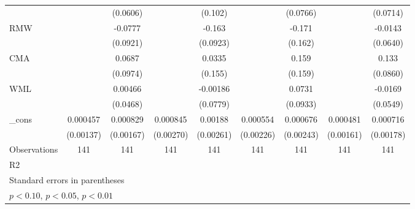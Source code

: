 \begin{table}[htbp]
\begin{tabular}{l*{8}{c}}
                    &                     &    (0.0606)         &                     &     (0.102)         &                     &    (0.0766)         &                     &    (0.0714)         \\
RMW                 &                     &     -0.0777         &                     &      -0.163\sym{*}  &                     &      -0.171         &                     &     -0.0143         \\
                    &                     &    (0.0921)         &                     &    (0.0923)         &                     &     (0.162)         &                     &    (0.0640)         \\
CMA                 &                     &      0.0687         &                     &      0.0335         &                     &       0.159         &                     &       0.133         \\
                    &                     &    (0.0974)         &                     &     (0.155)         &                     &     (0.159)         &                     &    (0.0860)         \\
WML                 &                     &     0.00466         &                     &    -0.00186         &                     &      0.0731         &                     &     -0.0169         \\
                    &                     &    (0.0468)         &                     &    (0.0779)         &                     &    (0.0933)         &                     &    (0.0549)         \\
\_cons              &    0.000457         &    0.000829         &    0.000845         &     0.00188         &    0.000554         &    0.000676         &    0.000481         &    0.000716         \\
                    &   (0.00137)         &   (0.00167)         &   (0.00270)         &   (0.00261)         &   (0.00226)         &   (0.00243)         &   (0.00161)         &   (0.00178)         \\
\hline
Observations        &         141         &         141         &         141         &         141         &         141         &         141         &         141         &         141         \\
R2                  &                     &                     &                     &                     &                     &                     &                     &                     \\
\hline\hline
\multicolumn{9}{l}{\footnotesize Standard errors in parentheses}\\
\multicolumn{9}{l}{\footnotesize \sym{*} \(p<0.10\), \sym{**} \(p<0.05\), \sym{***} \(p<0.01\)}\\
\end{tabular}
\end{table}
